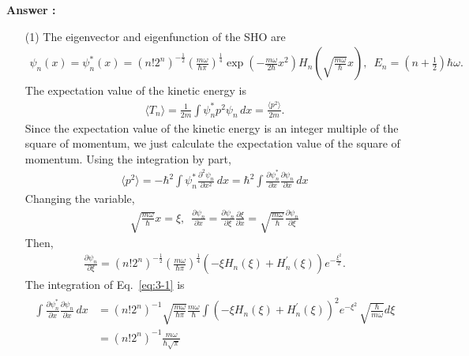 \documentclass[floatfix,nofootinbib,superscriptaddress,fleqn]{revtex4-2}
\begin{document}
\noindent \textbf{Answer : }
\begin{itemize}
  \item[(1)] The eigenvector and eigenfunction of the SHO are
  \begin{align}\label{eq:3}
    \psi_n(x)=\psi^*_n(x)= (n!2^n)^{-\frac{1}{2}}
    \left(\frac{m\omega}{\hbar\pi}\right)^{\frac{1}{4}}
    \exp\left(-\frac{m\omega}{2\hbar}x^2\right)
    H_n\left(\sqrt{\frac{m\omega}{\hbar}}x\right),\,\,\,
    E_n=\left( n+\frac{1}{2} \right)\hbar\omega.
  \end{align}
  The expectation value of the kinetic energy is
  \begin{align}
   \langle T_n\rangle = \frac{1}{2m}\int \psi^*_n p^2 
   \psi_n\,dx
   =\frac{\langle p^2\rangle}{2m}.
  \end{align}
  Since the expectation value of the kinetic energy is 
  an integer multiple of the square of momentum, we just 
  calculate the expectation value of the 
  square of momentum. Using the integration by part,
  \begin{align}\label{eq:3-1}
    \langle p^2\rangle = -\hbar^2\int \psi^*_n 
    \frac{\partial^2 \psi_n}{\partial x^2} \,dx
    =\hbar^2\int\frac{\partial \psi^*_n}{\partial x} 
    \frac{\partial \psi_n}{\partial x} \,dx
  \end{align}
  Changing the variable,
  \begin{align}\label{eq:3-2}
    \sqrt{\frac{m\omega}{\hbar}}x = \xi,\,\,\,
    \frac{\partial \psi_n}{\partial x}
    =\frac{\partial \psi_n}{\partial \xi}
    \frac{\partial \xi}{\partial x}
    =\sqrt{\frac{m\omega}{\hbar}}
    \frac{\partial \psi_n}{\partial \xi}
  \end{align}  
  Then,
  \begin{align}
    \frac{\partial \psi_n}{\partial \xi}
    =(n!2^n)^{-\frac{1}{2}}
    \left(\frac{m\omega}{\hbar\pi}\right)^{\frac{1}{4}}
    (-\xi H_n\left(\xi\right) 
    +H^\prime_n\left(\xi\right))
    e^{-\frac{\xi^2}{2}}.
  \end{align}
  The integration of Eq.~\eqref{eq:3-1} is
  \begin{align}
    \begin{split}
      \int\frac{\partial \psi^*_n}{\partial x} 
      \frac{\partial \psi_n}{\partial x} \,dx
      &= (n!2^n)^{-1}\sqrt{\frac{m\omega}{\hbar\pi}}
      \frac{m\omega}{\hbar}\int{(-\xi H_n\left(\xi\right) 
      +H^\prime_n\left(\xi\right))}^2 e^{-\xi^2}\,
      \sqrt{\frac{\hbar}{m\omega}}d\xi  \\
      &= (n!2^n)^{-1}\frac{m\omega}{\hbar\sqrt{\pi}}

\end{split}
\end{align}
\end{itemize}
\end{document}
